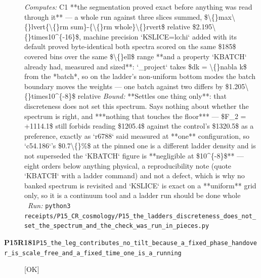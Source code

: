 \begin{description}
\emph{Computes:} C1 **the segmentation proved exact before anything was read through it** --- a whole run against three slices summed, \$\textbackslash\{\}max\textbackslash\{\}lvert\{\textbackslash\{\}rm sum\}-\{\textbackslash\{\}rm whole\}\textbackslash\{\}rvert\$ relative \$2.195\textbackslash\{\}times10\textasciicircum{}\{-16\}\$, machine precision  `KSLICE=lo:hi` added with its default proved byte-identical  both spectra scored on the same \$185\$ covered bins over the same \$\textbackslash\{\}ell\$ range  **and a property `KBATCH` already had, measured and sized**: `\_project` takes \$dk = \textbackslash\{\}nabla k\$ from the *batch*, so on the ladder's non-uniform bottom modes the batch boundary moves the weights --- one batch against two differs by \$1.205\textbackslash\{\}times10\textasciicircum{}\{-8\}\$ relative
 \emph{Bound:}  **Settles one thing only**: that discreteness does not set this spectrum. Says nothing about whether the spectrum is right, and ***nothing that touches the floor*** --- \$F\_2 = +1114.1\$ still forbids reading \$1205.4\$ against the control's \$1320.5\$ as a preference, exactly as `r6788` said  measured at **one** configuration, so `c54.186`'s \$0.7\textbackslash\{\}\%\$ at the pinned one is a different ladder density and is not superseded  the `KBATCH` figure is **negligible at \$10\textasciicircum{}\{-8\}\$** --- eight orders below anything physical, a reproducibility note (quote `KBATCH` with a ladder command) and not a defect, which is why no banked spectrum is revisited  and `KSLICE` is exact on a **uniform** grid only, so it is a continuum tool and a ladder run should be done whole
\ \emph{Run:} \texttt{python3 receipts/P15\_CR\_cosmology/P15\_the\_ladders\_discreteness\_does\_not\_set\_the\_spectrum\_and\_the\_check\_was\_run\_in\_pieces.py}
\item[\rcptlabel{P15_the_leg_contributes_no_tilt_because_a_fixed_phase_handover_is_scale_free_and_a_fixed_time_one_is_a_running}{P15R181}\textbf{P15R181}\quad\texttt{P15\_the\_leg\_contributes\_no\_tilt\_because\_a\_fixed\_phase\_handover\_is\_scale\_free\_and\_a\_fixed\_time\_one\_is\_a\_running}]\hfill\textsf{[OK]}\\

\end{description}

